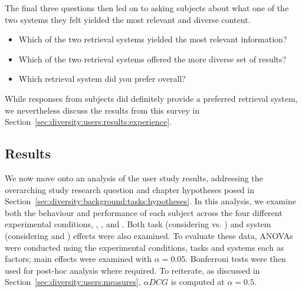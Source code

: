 The final three questions then led on to asking subjects about what one of the two systems they felt yielded the most relevant and diverse content.

\begin{itemize}
    \item{ Which of the two retrieval systems yielded the most relevant information?}
    \item{ Which of the two retrieval systems offered the more diverse set of results?}
    \item{ Which retrieval system did you prefer overall?}
\end{itemize}

While responses from subjects did definitely provide a preferred retrieval system, we nevertheless discuss the results from this survey in Section~\ref{sec:diversity:users:results:experience}.

\subsection{Results}
We now move onto an analysis of the user study results, addressing the overarching study research question and chapter hypotheses posed in Section~\ref{sec:diversity:background:tasks:hypotheses}. In this analysis, we examine both the behaviour and performance of each subject across the four different experimental conditions, , ,  and . Both task (considering  vs. ) and system (considering  and ) effects were also examined. To evaluate these data, ANOVAs were conducted using the experimental conditions, tasks and systems each as factors; main effects were examined with $\alpha=0.05$. Bonferroni tests were then used for post-hoc analysis where required. To reiterate, as discussed in Section~\ref{sec:diversity:users:measures}, $\alpha DCG$ is computed at $\alpha=0.5$.

